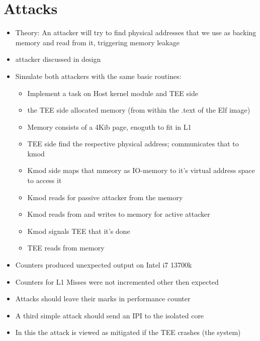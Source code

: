 \section{Attacks}
\begin{itemize}
    \item Theory: An attacker will try to find physical addresses that we use
          as backing memory and read from it, triggering memory leakage
    \item attacker discussed in design
    \item Simulate both attackers with the same basic routines:
          \begin{itemize}
              \item Implement a task on Host kernel module and TEE side
              \item the TEE side allocated memory (from within the .text of the Elf image)
              \item Memory consists of a 4Kib page, enoguth to fit in L1
              \item TEE side find the respective physical address; communicates that to kmod
              \item Kmod side maps that mmeory as IO-memory to it's virtual address space to access it
              \item Kmod reads for passive attacker from the memory
              \item Kmod reads from and writes to memory for active attacker
              \item Kmod signals TEE that it's done
              \item TEE reads from memory
          \end{itemize}
    \item Counters produced unexpected output on Intel i7 13700k
    \item Counters for L1 Misses were not incremented other then expected
    \item Attacks should leave their marks in performance counter
    \item A third simple attack should send an IPI to the isolated core
    \item In this the attack is viewed as mitigated if the TEE crashes (the system)
\end{itemize}

\cleardoublepage

